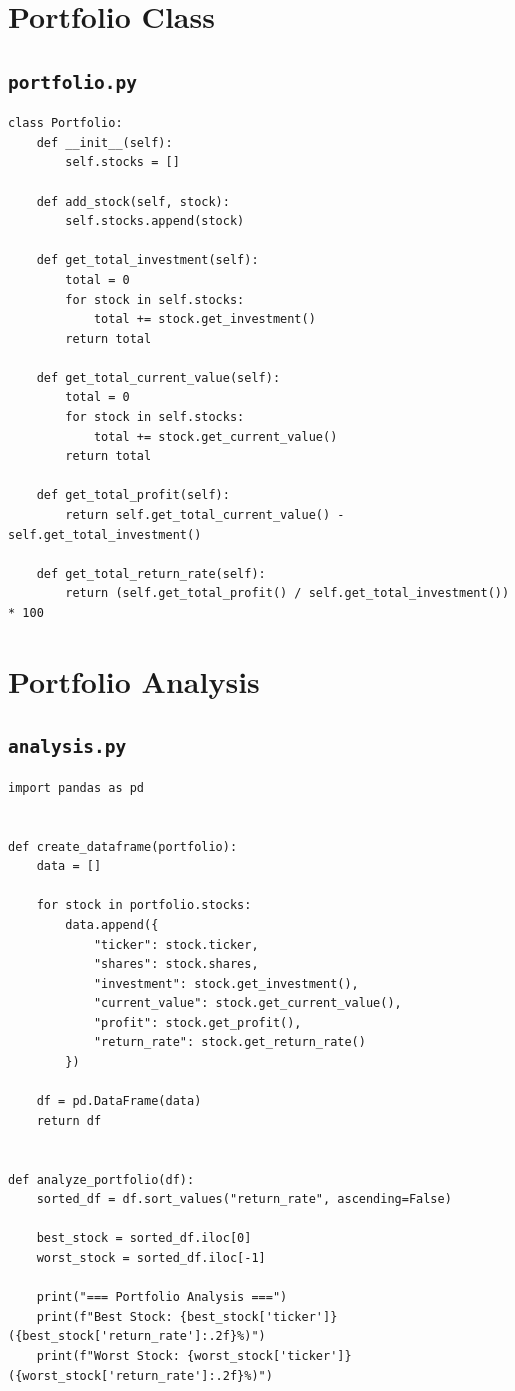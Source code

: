 \documentclass[11pt,a4paper]{article}
\begin{document}
\section{Portfolio Class}

\subsection{\texttt{portfolio.py}}

\begin{lstlisting}
class Portfolio:
    def __init__(self):
        self.stocks = []

    def add_stock(self, stock):
        self.stocks.append(stock)

    def get_total_investment(self):
        total = 0
        for stock in self.stocks:
            total += stock.get_investment()
        return total

    def get_total_current_value(self):
        total = 0
        for stock in self.stocks:
            total += stock.get_current_value()
        return total

    def get_total_profit(self):
        return self.get_total_current_value() - self.get_total_investment()

    def get_total_return_rate(self):
        return (self.get_total_profit() / self.get_total_investment()) * 100
\end{lstlisting}

\section{Portfolio Analysis}

\subsection{\texttt{analysis.py}}

\begin{lstlisting}
import pandas as pd


def create_dataframe(portfolio):
    data = []

    for stock in portfolio.stocks:
        data.append({
            "ticker": stock.ticker,
            "shares": stock.shares,
            "investment": stock.get_investment(),
            "current_value": stock.get_current_value(),
            "profit": stock.get_profit(),
            "return_rate": stock.get_return_rate()
        })

    df = pd.DataFrame(data)
    return df


def analyze_portfolio(df):
    sorted_df = df.sort_values("return_rate", ascending=False)

    best_stock = sorted_df.iloc[0]
    worst_stock = sorted_df.iloc[-1]

    print("=== Portfolio Analysis ===")
    print(f"Best Stock: {best_stock['ticker']} ({best_stock['return_rate']:.2f}%)")
    print(f"Worst Stock: {worst_stock['ticker']} ({worst_stock['return_rate']:.2f}%)")
\end{lstlisting}
\end{document}
